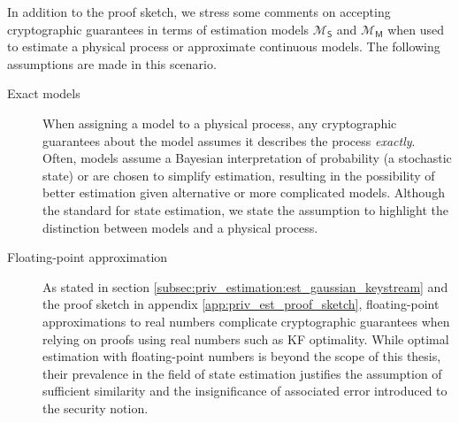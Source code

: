 In addition to the proof sketch, we stress some comments on accepting cryptographic guarantees in terms of estimation models $\mathcal{M}_{\mathsf{S}}$ and $\mathcal{M}_{\mathsf{M}}$ when used to estimate a physical process or approximate continuous models. The following assumptions are made in this scenario.
\begin{description}
   \item[Exact models] When assigning a model to a physical process, any cryptographic guarantees about the model assumes it describes the process \textit{exactly}. Often, models assume a Bayesian interpretation of probability (a stochastic state) or are chosen to simplify estimation, resulting in the possibility of better estimation given alternative or more complicated models. Although the standard for state estimation, we state the assumption to highlight the distinction between models and a physical process.
   \item[Floating-point approximation] As stated in section \ref{subsec:priv_estimation:est_gaussian_keystream} and the proof sketch in appendix \ref{app:priv_est_proof_sketch}, floating-point approximations to real numbers complicate cryptographic guarantees when relying on proofs using real numbers such as KF optimality. While optimal estimation with floating-point numbers is beyond the scope of this thesis, their prevalence in the field of state estimation justifies the assumption of sufficient similarity and the insignificance of associated error introduced to the security notion.
\end{description}

% 
% 



